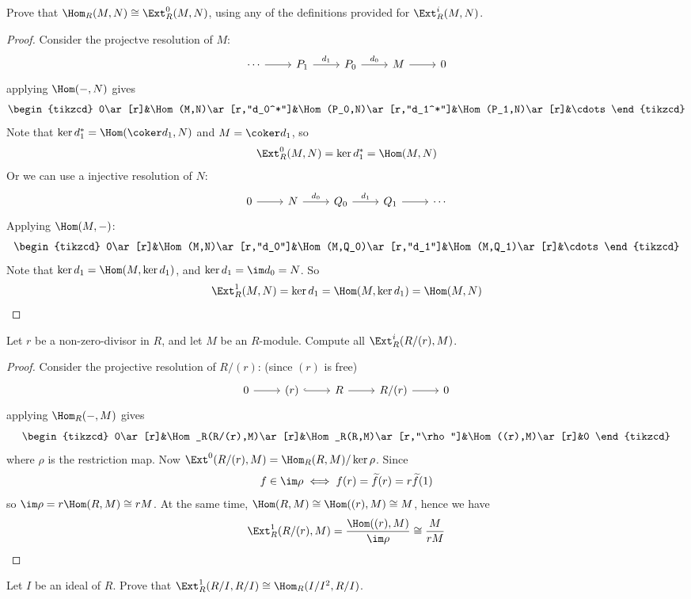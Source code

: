 \begin{exercise}
Prove that $\Hom_R(M,N)\cong\Ext^0_R(M,N)$, using any of the definitions provided for $\Ext^i_R(M,N)$.
\end{exercise}
\begin{proof}
Consider the projectve resolution of $M$:
\[\begin{tikzcd}
\cdots\ar[r]&P_1\ar[r,"d_1"]&P_0\ar[r,"d_0"]&M\ar[r]&0
\end{tikzcd}\]
applying $\Hom(-,N)$ gives
\[\begin{tikzcd}
0\ar[r]&\Hom(M,N)\ar[r,"d_0^*"]&\Hom(P_0,N)\ar[r,"d_1^*"]&\Hom(P_1,N)\ar[r]&\cdots
\end{tikzcd}\]
Note that $\ker d_1^*=\Hom(\coker d_1,N)$ and $M=\coker d_1$, so
\[\Ext^0_R(M,N)=\ker d_1^*=\Hom(M,N)\]
Or we can use a injective resolution of $N$:
\[\begin{tikzcd}
0\ar[r]&N\ar[r,"d_0"]&Q_0\ar[r,"d_1"]&Q_1\ar[r]&\cdots
\end{tikzcd}\]
Applying $\Hom(M,-)$:
\[\begin{tikzcd}
0\ar[r]&\Hom(M,N)\ar[r,"d_0"]&\Hom(M,Q_0)\ar[r,"d_1"]&\Hom(M,Q_1)\ar[r]&\cdots
\end{tikzcd}\]
Note that $\ker d_1=\Hom(M,\ker d_1)$, and $\ker d_1=\im d_0=N$. So
\[\Ext^1_R(M,N)=\ker d_1=\Hom(M,\ker d_1)=\Hom(M,N)\]
\end{proof}
\begin{exercise}
Let $r$ be a non-zero-divisor in $R$, and let $M$ be an $R$-module. Compute all $\Ext^i_R(R/(r),M)$.
\end{exercise}
\begin{proof}
Consider the projective resolution of $R/(r)$: (since $(r)$ is free)
\[\begin{tikzcd}
0\ar[r]&(r)\ar[r,hook]&R\ar[r]&R/(r)\ar[r]&0
\end{tikzcd}\]
applying $\Hom_R(-,M)$ gives
\[\begin{tikzcd}
0\ar[r]&\Hom_R(R/(r),M)\ar[r]&\Hom_R(R,M)\ar[r,"\rho"]&\Hom((r),M)\ar[r]&0
\end{tikzcd}\]
where $\rho$ is the restriction map. Now $\Ext^0(R/(r),M)=\Hom_R(R,M)/\ker\rho$. Since 
\[f\in\im\rho\iff f(r)=\widetilde{f}(r)=r\widetilde{f}(1)\]
so $\im\rho=r\Hom(R,M)\cong rM$. At the same time, $\Hom(R,M)\cong\Hom((r),M)\cong M$, hence we have
\[\Ext^1_R(R/(r),M)=\dfrac{\Hom((r),M)}{\im\rho}\cong\dfrac{M}{rM}\]
\end{proof}
\begin{exercise}
Let $I$ be an ideal of $R$. Prove that $\Ext^1_R(R/I,R/I)\cong\Hom_R(I/I^2,R/I)$.
\end{exercise}
